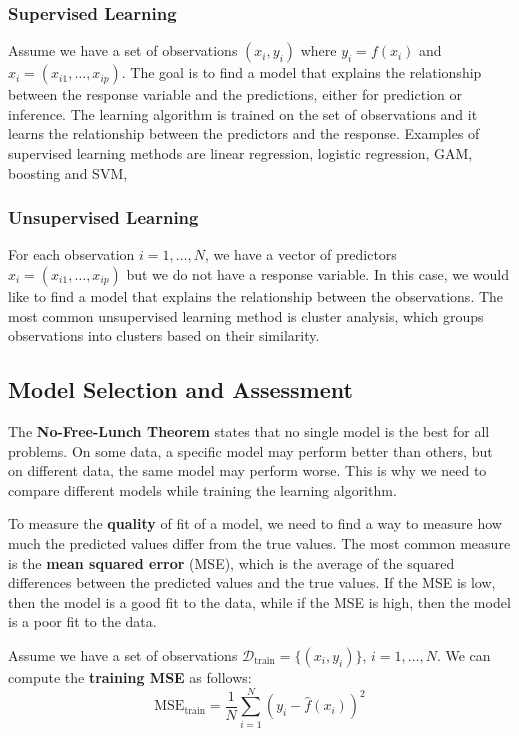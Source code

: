 \subsubsection*{Supervised Learning}
Assume we have a set of observations $(x_i, y_i)$ where $y_i = f(x_i)$ and $x_i = (x_{i1}, \dots, x_{ip})$. The goal is to find a model that explains the relationship between the response variable and the predictions, either for prediction or inference. The learning algorithm is trained on the set of observations and it learns the relationship between the predictors and the response. Examples of supervised learning methods are linear regression, logistic regression, GAM, boosting and SVM,

\subsubsection*{Unsupervised Learning}
For each observation $i=1,\dots,N$, we have a vector of predictors $x_i = (x_{i1}, \dots, x_{ip})$ but we do not have a response variable. In this case, we would like to find a model that explains the relationship between the observations. The most common unsupervised learning method is cluster analysis, which groups observations into clusters based on their similarity.

\subsection*{Model Selection and Assessment}
The \textbf{No-Free-Lunch Theorem} states that no single model is the best for all problems. On some data, a specific model may perform better than others, but on different data, the same model may perform worse. This is why we need to compare different models while training the learning algorithm.

To measure the \textbf{quality} of fit of a model, we need to find a way to measure how much the predicted values differ from the true values. The most common measure is the \textbf{mean squared error} (MSE), which is the average of the squared differences between the predicted values and the true values. If the MSE is low, then the model is a good fit to the data, while if the MSE is high, then the model is a poor fit to the data.

Assume we have a set of observations $\mathcal{D}_{\text{train}} = \{(x_i, y_i)\}$, $i=1,\dots,N$. We can compute the \textbf{training MSE} as follows:
\[
    \text{MSE}_{\text{train}} = \frac{1}{N} \sum_{i=1}^{N} (y_i - \hat{f}(x_i))^2
\]

